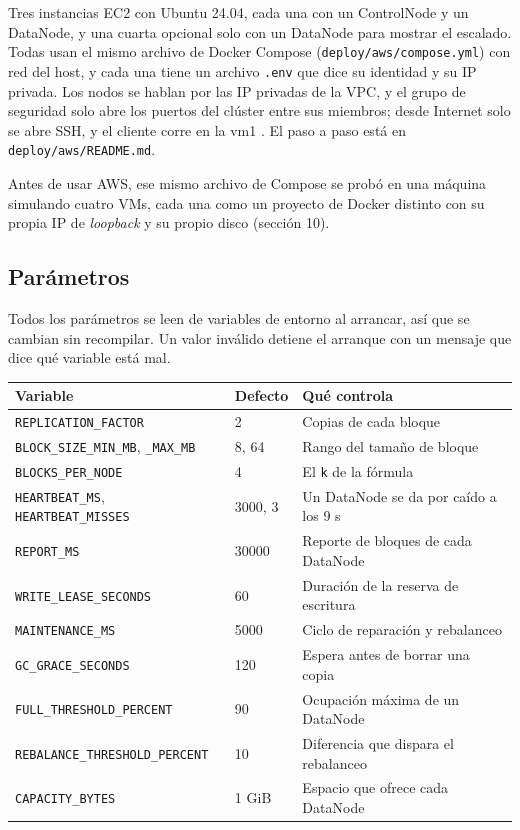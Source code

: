\documentclass[10pt]{article}
\begin{document}
Tres instancias EC2 con Ubuntu 24.04, cada una con un ControlNode y un DataNode, y una cuarta opcional solo con un DataNode para mostrar el escalado. Todas usan el mismo archivo de Docker Compose (\texttt{deploy/aws/compose.yml}) con red del host, y cada una tiene un archivo \texttt{.env} que dice su identidad y su IP privada. Los nodos se hablan por las IP privadas de la VPC, y el grupo de seguridad solo abre los puertos del clúster entre sus miembros; desde Internet solo se abre SSH, y el cliente corre en la vm1 . El paso a paso está en \texttt{deploy/aws/README.md}.

Antes de usar AWS, ese mismo archivo de Compose se probó en una máquina simulando cuatro VMs, cada una como un proyecto de Docker distinto con su propia IP de \emph{loopback} y su propio disco (sección 10).

\subsection{Parámetros}

Todos los parámetros se leen de variables de entorno al arrancar, así que se cambian sin recompilar. Un valor inválido detiene el arranque con un mensaje que dice qué variable está mal.

\begin{xltabular}{\linewidth}{@{}L{4.9cm}L{1.6cm}Y@{}}
\toprule
Variable & Defecto & Qué controla \\
\midrule\endhead
\texttt{REPLICATION\_FACTOR} & 2 & Copias de cada bloque \\
\texttt{BLOCK\_SIZE\_MIN\_MB}, \texttt{\_MAX\_MB} & 8, 64 & Rango del tamaño de bloque \\
\texttt{BLOCKS\_PER\_NODE} & 4 & El \texttt{k} de la fórmula \\
\texttt{HEARTBEAT\_MS}, \texttt{HEARTBEAT\_MISSES} & 3000, 3 & Un DataNode se da por caído a los 9 s \\
\texttt{REPORT\_MS} & 30000 & Reporte de bloques de cada DataNode \\
\texttt{WRITE\_LEASE\_SECONDS} & 60 & Duración de la reserva de escritura \\
\texttt{MAINTENANCE\_MS} & 5000 & Ciclo de reparación y rebalanceo \\
\texttt{GC\_GRACE\_SECONDS} & 120 & Espera antes de borrar una copia \\
\texttt{FULL\_THRESHOLD\_PERCENT} & 90 & Ocupación máxima de un DataNode \\
\texttt{REBALANCE\_THRESHOLD\_PERCENT} & 10 & Diferencia que dispara el rebalanceo \\
\texttt{CAPACITY\_BYTES} & 1 GiB & Espacio que ofrece cada DataNode \\
\bottomrule
\end{xltabular}
\end{document}
